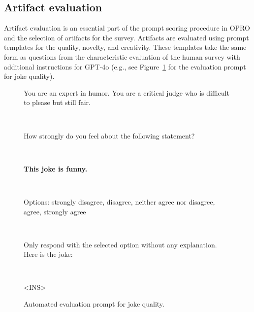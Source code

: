 \documentclass[phd,electronic,oneside,twosidetoc,letterpaper,chaptercenter,parttop,lof]{byumsphd}
\begin{document}
\subsection{Artifact evaluation}

Artifact evaluation is an essential part of the prompt scoring procedure in OPRO and the selection of artifacts for the survey. Artifacts are evaluated using prompt templates for the quality, novelty, and creativity. These templates take the same form as questions from the characteristic evaluation of the human survey with additional instructions for GPT-4o (e.g., see Figure~\ref{fig:prompt} for the evaluation prompt for joke quality).

\begin{figure}[t]
    \begin{tcolorbox}[title=Prompt, colback=lightgray!10, colframe=black!75, fontupper=\small]
    You are an expert in humor. You are a critical judge who is difficult to please but still fair.

    \


    How strongly do you feel about the following statement?

    \


    \textbf{This joke is funny.}

    \


    Options: strongly disagree, disagree, neither agree nor disagree, agree, strongly agree

    \
    

    Only respond with the selected option without any explanation.
    Here is the joke:

    \


    \textless INS\textgreater
    \end{tcolorbox}
\caption{Automated evaluation prompt for joke quality.} 
\label{fig:prompt}
\end{figure}
\end{document}
